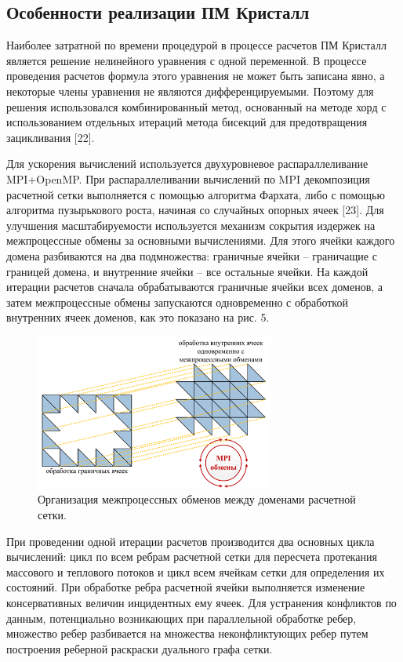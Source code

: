 \documentclass{psta}%
\begin{document}
\subsection{Особенности реализации ПМ Кристалл}

Наиболее затратной по времени процедурой в процессе расчетов ПМ Кристалл является решение нелинейного уравнения с одной переменной.
В процессе проведения расчетов формула этого уравнения не может быть записана явно, а некоторые члены уравнения не являются дифференцируемыми. Поэтому для решения использовался комбинированный метод, основанный на методе хорд с использованием отдельных итераций метода бисекций для предотвращения зацикливания [22].

Для ускорения вычислений используется двухуровневое распараллеливание MPI+OpenMP. При распараллеливании вычислений по MPI декомпозиция расчетной сетки выполняется с помощью алгоритма Фархата, либо с помощью алгоритма пузырькового роста, начиная со случайных опорных ячеек [23].
Для улучшения масштабируемости используется механизм сокрытия издержек на межпроцессные обмены за основными вычислениями.
Для этого ячейки каждого домена разбиваются на два подмножества: граничные ячейки -- граничащие с границей домена, и внутренние ячейки -- все остальные ячейки.
На каждой итерации расчетов сначала обрабатываются граничные ячейки всех доменов, а затем межпроцессные обмены запускаются одновременно с обработкой внутренних ячеек доменов, как это показано на рис. 5.

\begin{figure}[ht]
\centering
\includegraphics[width=0.7\textwidth]{pics/mpi.png}
\caption{Организация межпроцессных обменов между доменами расчетной сетки.}
\label{fig:mpi}
\end{figure}

При проведении одной итерации расчетов производится два основных цикла вычислений: цикл по всем ребрам расчетной сетки для пересчета протекания массового и теплового потоков и цикл всем ячейкам сетки для определения их состояний.
При обработке ребра расчетной ячейки выполняется изменение консервативных величин инцидентных ему ячеек.
Для устранения конфликтов по данным, потенциально возникающих при параллельной обработке ребер, множество ребер разбивается на множества неконфликтующих ребер путем построения реберной раскраски дуального графа сетки.
\end{document}
